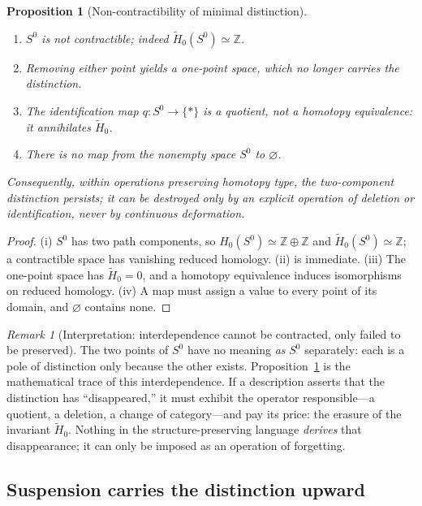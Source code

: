 \documentclass[11pt,a4paper]{article}
\newtheorem{proposition}[theorem]{Proposition}
\theoremstyle{definition}
\theoremstyle{remark}
\newtheorem{remark}[theorem]{Remark}
\newcommand{\Szero}{S^{0}}
\newcommand{\Z}{\mathbb{Z}}
\begin{document}
\begin{proposition}[Non-contractibility of minimal distinction]
\label{prop:s0-noncontract}
\leavevmode
\begin{enumerate}[label=(\roman*)]
\item $\Szero$ is not contractible; indeed $\widetilde H_{0}(\Szero)\simeq\Z$.
\item Removing either point yields a one-point space, which no longer carries the distinction.
\item The identification map $q:\Szero\to\{*\}$ is a quotient, not a homotopy equivalence:
it annihilates $\widetilde H_{0}$.
\item There is no map from the nonempty space $\Szero$ to $\varnothing$.
\end{enumerate}
Consequently, within operations preserving homotopy type, the two-component distinction
persists; it can be destroyed only by an explicit operation of deletion or identification, never
by continuous deformation.
\end{proposition}

\begin{proof}
(i) $\Szero$ has two path components, so $H_{0}(\Szero)\simeq\Z\oplus\Z$ and
$\widetilde H_{0}(\Szero)\simeq\Z$; a contractible space has vanishing reduced homology.
(ii) is immediate.  (iii) The one-point space has $\widetilde H_{0}=0$, and a homotopy
equivalence induces isomorphisms on reduced homology.  (iv) A map must assign a value to every
point of its domain, and $\varnothing$ contains none.
\end{proof}

\begin{remark}[Interpretation: interdependence cannot be contracted, only failed to be preserved]
The two points of $\Szero$ have no meaning \emph{as} $\Szero$ separately: each is a pole of
distinction only because the other exists.  Proposition~\ref{prop:s0-noncontract} is the
mathematical trace of this interdependence.  If a description asserts that the distinction has
``disappeared,'' it must exhibit the operator responsible---a quotient, a deletion, a change of
category---and pay its price: the erasure of the invariant $\widetilde H_{0}$.  Nothing in the
structure-preserving language \emph{derives} that disappearance; it can only be imposed as an
operation of forgetting.
\end{remark}

\subsection{Suspension carries the distinction upward}
\end{document}

